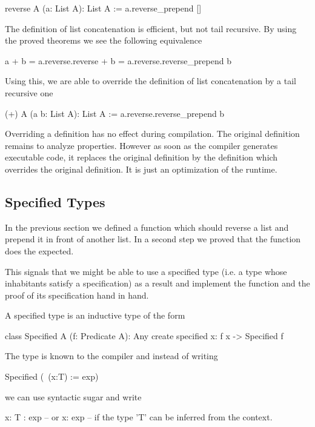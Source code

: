 \begin{alba}
  reverse A (a: List A): List A :=
    a.reverse_prepend []
\end{alba}

The definition of list concatenation is efficient, but not tail recursive. By
using the proved theorems we see the following equivalence
%
\begin{alba}
  a + b   =  a.reverse.reverse + b
          =  a.reverse.reverse_prepend b
\end{alba}

Using this, we are able to override the definition of list concatenation by a
tail recursive one

\begin{alba}
  (+) A (a b: List A): List A :=
    a.reverse.reverse_prepend b
\end{alba}

Overriding a definition has no effect during compilation. The original
definition remains to analyze properties. However as soon as the compiler
generates executable code, it replaces the original definition by the
definition which overrides the original definition. It is just an optimization
of the runtime.





\subsection{Specified Types}

In the previous section we defined a function  which
should reverse a list and prepend it in front of another list. In a second
step we proved that the function does the expected.

This signals that we might be able to use a specified type (i.e. a type whose
inhabitants satisfy a specification) as a result and implement the function
and the proof of its specification hand in hand.

A specified type is an inductive type of the form
%
\begin{alba}
   class Specified A (f: Predicate A): Any create
     specified x: f x -> Specified f
\end{alba}

The type  is known to the compiler and instead of writing
%
\begin{alba}
  Specified (\ (x:T) := exp)
\end{alba}
%
we can use syntactic sugar and write
%
\begin{alba}
  {x: T : exp}
  -- or
  {x: exp}     -- if the type 'T' can be inferred from the context.
\end{alba}



